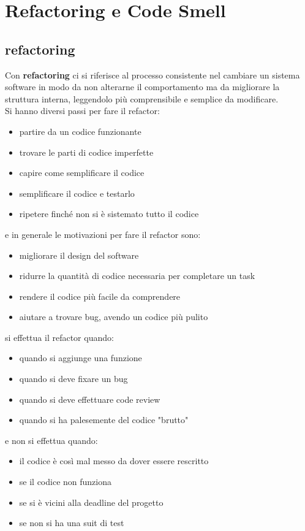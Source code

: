 \documentclass[a4paper,12pt, oneside]{book}
\begin{document}
\chapter{Refactoring e Code Smell}
\section{refactoring}
Con \textbf{refactoring} ci si riferisce al processo consistente nel cambiare un sistema software in modo da non alterarne il comportamento ma da migliorare la struttura interna, leggendolo più comprensibile e semplice da modificare. \\
Si hanno diversi passi per fare il refactor:
\begin{itemize}
\item partire da un codice funzionante
\item trovare le parti di codice imperfette
\item capire come semplificare il codice
\item semplificare il codice e testarlo
\item ripetere finché non si è sistemato tutto il codice
\end{itemize}
e in generale le motivazioni per fare il refactor sono:
\begin{itemize}
\item migliorare il design del software
\item ridurre la quantità di codice necessaria per completare un task
\item rendere il codice più facile da comprendere
\item aiutare a trovare bug, avendo un codice più pulito
\end{itemize}
si effettua il refactor quando:
\begin{itemize}
\item quando si aggiunge una funzione
\item quando si deve fixare un bug
\item quando si deve effettuare code review
\item quando si ha palesemente del codice "brutto"
\end{itemize}
e non si effettua quando:
\begin{itemize}
\item il codice è così mal messo da dover essere rescritto
\item se il codice non funziona
\item se si è vicini alla deadline del progetto
\item se non si ha una suit di test
\end{itemize}
\end{document}
